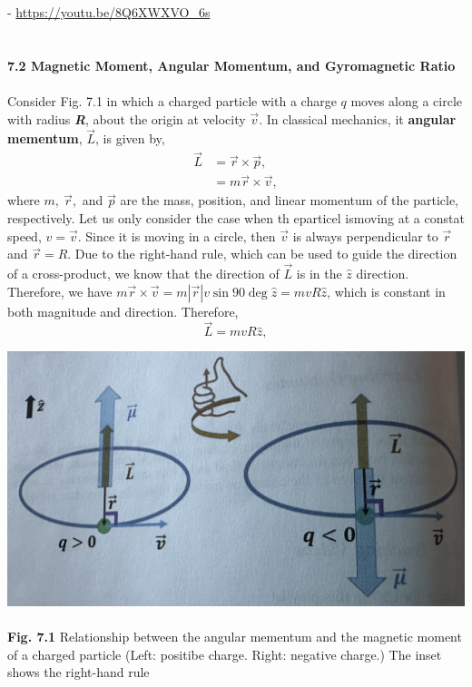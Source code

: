 \documentclass{article}
\newcommand{\bfit}[1]{\textit{\textbf{#1}}}
\begin{document}
- \url{https://youtu.be/8Q6XWXVO_6s}\\\\\\
\textbf{\large 7.2 Magnetic Moment, Angular Momentum, and Gyromagnetic Ratio}\\\\
Consider Fig. 7.1 in which a charged particle with a charge $q$ moves along
a circle with radius \bfit{R}, about the origin at velocity $\vec{v}$. In classical
mechanics, it \textbf{angular mementum}, $\vec{L}$, is given by,
\begin{align*}\label{eq 7.1}
    \vec{L}&=\vec{r}\times\vec{p},\\
    &=m\vec{r}\times\vec{v},\tag{7.1}
\end{align*}
where $m,\: \vec{r},$ and $\vec{p}$ are the mass, position, and linear momentum of the
particle, respectively. Let us only consider the case when th eparticel ismoving at a constat speed, $v=\vec{v}$. Since it is moving in a circle, then 
$\vec{v}$ is always perpendicular to $\vec{r}$ and $\vec{r}=R$. Due to the right-hand rule, which can be used to guide the direction 
of a cross-product, we know that the direction of $\vec{L}$ is in the $\hat{z}$ direction. Therefore, we have $m\vec{r}\times\vec{v}=m|\vec{r}|v\sin{90\deg}\hat{z}
=mvR\hat{z}$, which is constant in both magnitude and direction. Therefore,
\begin{equation} \label{eq 7.2}
    \vec{L}=mvR\hat{z},\tag{7.2}
\end{equation}


\includegraphics[scale=0.4]{Fig.7.1.jpeg} \\\\
\textbf{Fig. 7.1} Relationship between the angular mementum and the magnetic moment of a charged particle (Left: 
positibe charge. Right: negative charge.) The inset shows the right-hand rule\\\\
\end{document}

